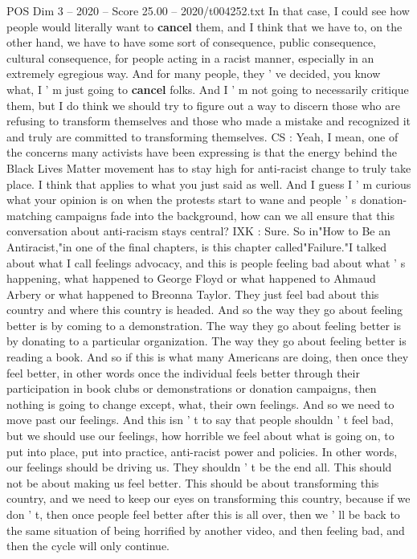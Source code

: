\begin{textsample}{POS Dim 3 – 2020 – Score 25.00 – 2020/t004252.txt}
In that case, I could see how people would literally want to \textbf{cancel} them, and I think that we have to, on the other hand, we have to have some sort of consequence, public consequence, cultural consequence, for people acting in a racist manner, especially in an extremely egregious way.
And for many people, they ' ve decided, you know what, I ' m just going to \textbf{cancel} folks.
And I ' m not going to necessarily critique them, but I do think we should try to figure out a way to discern those who are refusing to transform themselves and those who made a mistake and recognized it and truly are committed to transforming themselves.
CS : Yeah, I mean, one of the concerns many activists have been expressing is that the energy behind the Black Lives Matter movement has to stay high for anti-racist change to truly take place.
I think that applies to what you just said as well.
And I guess I ' m curious what your opinion is on when the protests start to wane and people ' s donation-matching campaigns fade into the background, how can we all ensure that this conversation about anti-racism stays central?
IXK : Sure.
So in"How to Be an Antiracist,"in one of the final chapters, is this chapter called"Failure."I talked about what I call feelings advocacy, and this is people feeling bad about what ' s happening, what happened to George Floyd or what happened to Ahmaud Arbery or what happened to Breonna Taylor.
They just feel bad about this country and where this country is headed.
And so the way they go about feeling better is by coming to a demonstration.
The way they go about feeling better is by donating to a particular organization.
The way they go about feeling better is reading a book.
And so if this is what many Americans are doing, then once they feel better, in other words once the individual feels better through their participation in book clubs or demonstrations or donation campaigns, then nothing is going to change except, what, their own feelings.
And so we need to move past our feelings.
And this isn ' t to say that people shouldn ' t feel bad, but we should use our feelings, how horrible we feel about what is going on, to put into place, put into practice, anti-racist power and policies.
In other words, our feelings should be driving us.
They shouldn ' t be the end all.
This should not be about making us feel better.
This should be about transforming this country, and we need to keep our eyes on transforming this country, because if we don ' t, then once people feel better after this is all over, then we ' ll be back to the same situation of being horrified by another video, and then feeling bad, and then the cycle will only continue.

\end{textsample}
